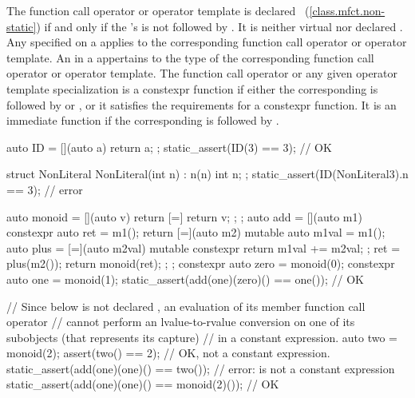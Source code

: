 \pnum
The function call operator or operator template is declared
~(\ref{class.mfct.non-static}) if and only if the
's  is not
followed by . It is neither virtual nor declared . Any
 specified on a 
applies to the corresponding function call operator or operator template.
An  in a  appertains
to the type of the corresponding function call operator or operator template.
The function call operator or any given operator template specialization
is a constexpr function if either
the corresponding 
is followed by  or , or
it satisfies the requirements for a constexpr function.
It is an immediate function
if the corresponding 
 is followed by .
\begin{example}
\begin{codeblock}
auto ID = [](auto a) { return a; };
static_assert(ID(3) == 3);                      // OK

struct NonLiteral {
  NonLiteral(int n) : n(n) { }
  int n;
};
static_assert(ID(NonLiteral{3}).n == 3);        // error
\end{codeblock}
\end{example}

\pnum
\begin{example}
\begin{codeblock}
auto monoid = [](auto v) { return [=] { return v; }; };
auto add = [](auto m1) constexpr {
  auto ret = m1();
  return [=](auto m2) mutable {
    auto m1val = m1();
    auto plus = [=](auto m2val) mutable constexpr
                   { return m1val += m2val; };
    ret = plus(m2());
    return monoid(ret);
  };
};
constexpr auto zero = monoid(0);
constexpr auto one = monoid(1);
static_assert(add(one)(zero)() == one());       // OK

// Since  below is not declared , an evaluation of its  member function call operator
// cannot perform an lvalue-to-rvalue conversion on one of its subobjects (that represents its capture)
// in a constant expression.
auto two = monoid(2);
assert(two() == 2); // OK, not a constant expression.
static_assert(add(one)(one)() == two());        // error:  is not a constant expression
static_assert(add(one)(one)() == monoid(2)());  // OK
\end{codeblock}
\end{example}

